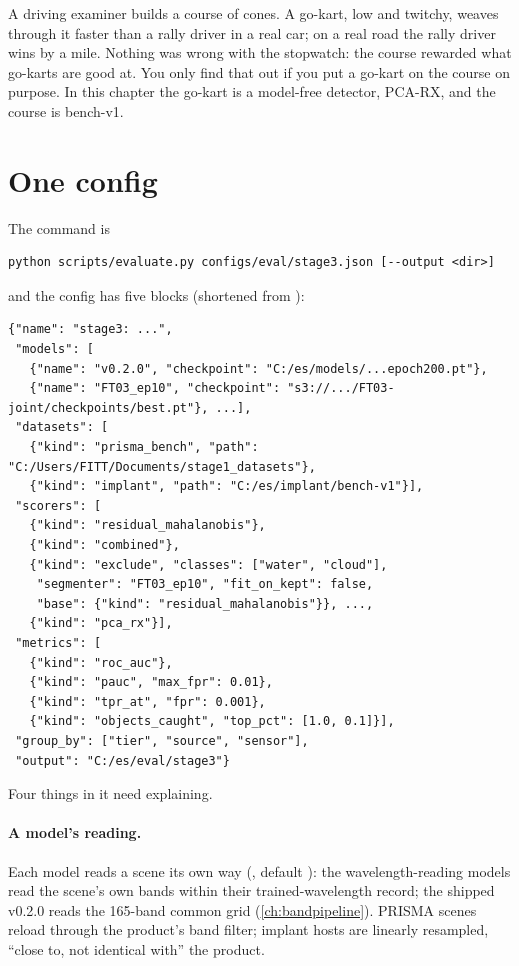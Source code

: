 \begin{analogy}
A driving examiner builds a course of cones. A go-kart, low and twitchy, weaves through it faster than a rally driver in
a real car; on a real road the rally driver wins by a mile. Nothing was wrong with the stopwatch: the course rewarded
what go-karts are good at. You only find that out if you put a go-kart on the course on purpose. In this chapter the
go-kart is a model-free detector, PCA-RX, and the course is bench-v1.
\end{analogy}

\section{One config}\label{sec:runeval:config}

The command is
\begin{lstlisting}[language={}]
python scripts/evaluate.py configs/eval/stage3.json [--output <dir>]
\end{lstlisting}
and the config has five blocks (shortened from ):
\begin{lstlisting}[basicstyle=\ttfamily\footnotesize,language={}]
{"name": "stage3: ...",
 "models": [
   {"name": "v0.2.0", "checkpoint": "C:/es/models/...epoch200.pt"},
   {"name": "FT03_ep10", "checkpoint": "s3://.../FT03-joint/checkpoints/best.pt"}, ...],
 "datasets": [
   {"kind": "prisma_bench", "path": "C:/Users/FITT/Documents/stage1_datasets"},
   {"kind": "implant", "path": "C:/es/implant/bench-v1"}],
 "scorers": [
   {"kind": "residual_mahalanobis"},
   {"kind": "combined"},
   {"kind": "exclude", "classes": ["water", "cloud"],
    "segmenter": "FT03_ep10", "fit_on_kept": false,
    "base": {"kind": "residual_mahalanobis"}}, ...,
   {"kind": "pca_rx"}],
 "metrics": [
   {"kind": "roc_auc"},
   {"kind": "pauc", "max_fpr": 0.01},
   {"kind": "tpr_at", "fpr": 0.001},
   {"kind": "objects_caught", "top_pct": [1.0, 0.1]}],
 "group_by": ["tier", "source", "sensor"],
 "output": "C:/es/eval/stage3"}
\end{lstlisting}

Four things in it need explaining.

\paragraph{A model's reading.} Each model reads a scene its own way (, default ): the
wavelength-reading models read the scene's own bands within their trained-wavelength record; the shipped v0.2.0 reads
the 165-band common grid (\cref{ch:bandpipeline}). PRISMA scenes reload through the product's band filter; implant
hosts are linearly resampled, ``close to, not identical with'' the product.

